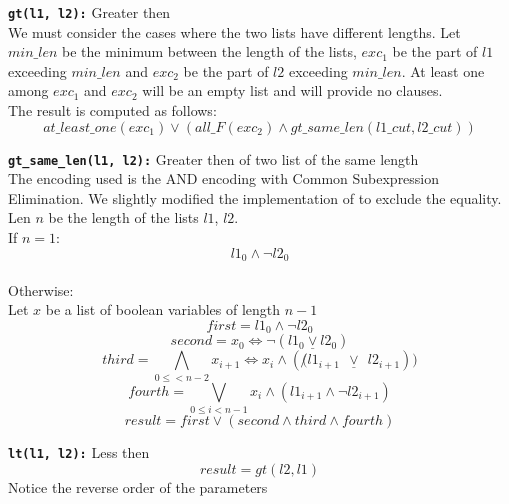 \texttt{\textbf{gt(l1, l2):}} Greater then\\
We must consider the cases where the two lists have different lengths.
Let $min\_len$ be the minimum between the length of the lists, $exc_1$ be the part of $l1$ 
exceeding $min\_len$ and $exc_2$ 
be the part of $l2$ exceeding $min\_len$. At least one among $exc_1$ and $exc_2$ will be an
empty list and will provide no clauses.\\
The result is computed as follows:
\begin{equation}
    at\_least\_one(exc_1) \vee ( all\_F(exc_2) \wedge gt\_same\_len(l1\_cut, l2\_cut))
\end{equation}

\texttt{\textbf{gt\_same\_len(l1, l2):}} Greater then of two list of the same length\\
The encoding used is the AND encoding with Common Subexpression Elimination. We slightly
modified the implementation of \cite{Zhao} to exclude the equality.\\
Len $n$ be the length of the lists $l1$, $l2$.\\
If $n=1$:
\begin{equation*}
    l1_0 \wedge \neg l2_0
\end{equation*}\\

Otherwise:\\
Let $x$ be a list of boolean variables of length $n-1$
\begin{equation*}
    first =  l1_0 \wedge \neg l2_0 %
\end{equation*}
%
\begin{equation*}
    second = x_0 \Longleftrightarrow \neg (l1_0 \underline\vee l2_0) %
\end{equation*}
%
\begin{equation*}
    third = \bigwedge\limits_{0 \leq <n-2} x_{i+1} \Longleftrightarrow x_i \wedge (\not (l1_{i+1} \ \ \underline\vee \ \ l2_{i+1}))%
\end{equation*}
%
\begin{equation*}
    fourth = \bigvee\limits_{0 \leq i < n-1} x_i \wedge (l1_{i+1} \wedge \neg l2_{i+1})
\end{equation*}
\begin{equation*}
    result = first \vee (second \wedge third \wedge fourth)
\end{equation*}

\texttt{\textbf{lt(l1, l2):}} Less then\\
\begin{equation}
    result = gt(l2, l1)
\end{equation}
Notice the reverse order of the parameters\\

